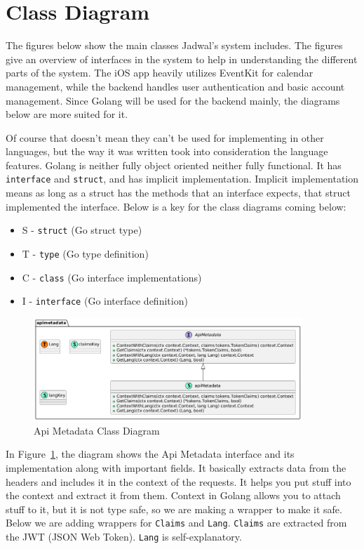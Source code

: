 \section{Class Diagram}

The figures below show the main classes Jadwal's system includes. The figures give an overview of interfaces in the system to help in understanding the different parts of the system. The iOS app heavily utilizes EventKit for calendar management, while the backend handles user authentication and basic account management.
Since Golang will be used for the backend mainly, the diagrams below are more suited for it.

Of course that doesn't mean they can't be used for implementing in other languages, but the way it was written took into consideration the language features. Golang is neither fully object oriented neither fully functional. It has \texttt{interface} and \texttt{struct}, and has implicit implementation. Implicit implementation means as long as a struct has the methods that an interface expects, that struct implemented the interface. Below is a key for the class diagrams coming below:
\begin{itemize}
    \item S - \texttt{struct} (Go struct type)
    \item T - \texttt{type} (Go type definition)
    \item C - \texttt{class} (Go interface implementations)
    \item I - \texttt{interface} (Go interface definition)
\end{itemize}

\begin{figure}[!h]
    \centering
    \includegraphics[width=0.9\textwidth]{images/docs/diagrams/class/class-diagram/apimetadata.png}
    \caption{Api Metadata Class Diagram}
    \label{fig:api-metadata-class-diagram}
\end{figure}

In Figure~\ref{fig:api-metadata-class-diagram}, the diagram shows the Api Metadata interface and its implementation along with important fields. It basically extracts data from the headers and includes it in the context of the requests. It helps you put stuff into the context and extract it from them. Context in Golang allows you to attach stuff to it, but it is not type safe, so we are making a wrapper to make it safe. Below we are adding wrappers for \texttt{Claims} and \texttt{Lang}. \texttt{Claims} are extracted from the JWT (JSON Web Token). \texttt{Lang} is self-explanatory.



